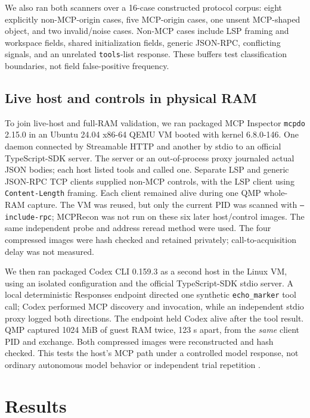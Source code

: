 \documentclass[conference,10pt]{IEEEtran}
\begin{document}
We also ran both scanners over a 16-case constructed protocol corpus: eight explicitly non-MCP-origin cases, five MCP-origin cases, one unsent MCP-shaped object, and two invalid/noise cases. Non-MCP cases include LSP framing and workspace fields, shared initialization fields, generic JSON-RPC, conflicting signals, and an unrelated \texttt{tools}-list response. These buffers test classification boundaries, not field false-positive frequency.

\subsection{Live host and controls in physical RAM}
To join live-host and full-RAM validation, we ran packaged MCP Inspector \texttt{mcpdo} 2.15.0 \cite{inspector} in an Ubuntu 24.04 x86-64 QEMU VM booted with kernel 6.8.0-146. One daemon connected by Streamable HTTP and another by stdio to an official TypeScript-SDK server. The server or an out-of-process proxy journaled actual JSON bodies; each host listed tools and called one. Separate LSP and generic JSON-RPC TCP clients supplied non-MCP controls, with the LSP client using \texttt{Content-Length} framing. Each client remained alive during one QMP whole-RAM capture. The VM was reused, but only the current PID was scanned with \texttt{--include-rpc}; MCPRecon was not run on these six later host/control images. The same independent probe and address reread method were used. The four compressed images were hash checked and retained privately; call-to-acquisition delay was not measured.

We then ran packaged Codex CLI 0.159.3 as a second host in the Linux VM, using an isolated configuration and the official TypeScript-SDK stdio server. A local deterministic Responses endpoint directed one synthetic \texttt{echo\_marker} tool call; Codex performed MCP discovery and invocation, while an independent stdio proxy logged both directions. The endpoint held Codex alive after the tool result. QMP captured 1024 MiB of guest RAM twice, 123 s apart, from the \emph{same} client PID and exchange. Both compressed images were reconstructed and hash checked. This tests the host's MCP path under a controlled model response, not ordinary autonomous model behavior or independent trial repetition \cite{mcptrace-codex}.

\section{Results}
\end{document}

